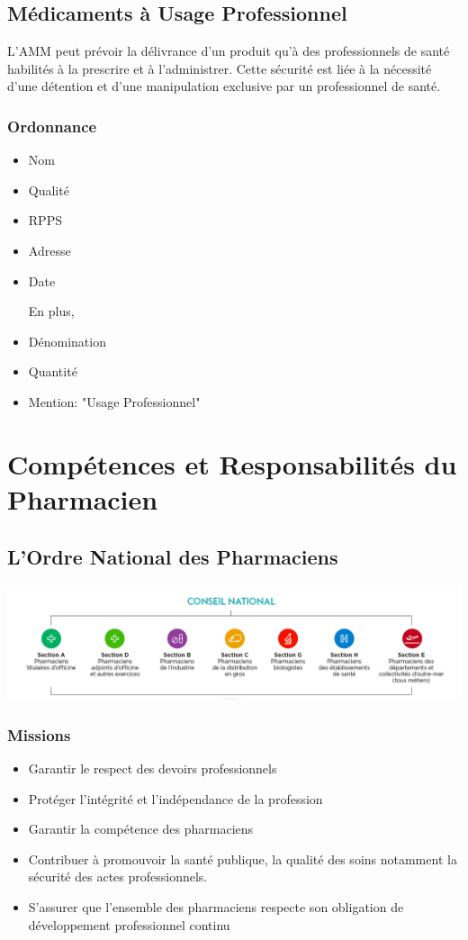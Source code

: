 \documentclass[11pt]{article}
\begin{document}
\subsection{Médicaments à Usage Professionnel}
\label{sec:org60f8e13}
L'AMM peut prévoir la délivrance d'un produit qu'à des professionnels de santé habilités à la prescrire et à l'administrer. Cette sécurité est liée à la nécessité d'une détention et d'une manipulation exclusive par un professionnel de santé.

\subsubsection{Ordonnance}
\label{sec:orgba079a4}
\begin{itemize}
\item Nom
\item Qualité
\item RPPS
\item Adresse
\item Date

En plus,
\item Dénomination
\item Quantité
\item Mention: "Usage Professionnel"
\end{itemize}
\section{Compétences et Responsabilités du Pharmacien}
\label{sec:orgb8c9648}
\setlength{\parindent}{0pt}
\subsection{L'Ordre National des Pharmaciens}
\label{sec:org79f30af}

\begin{center}
\includegraphics[width=.9\linewidth]{./ordre.png}
\end{center}
\subsubsection{Missions}
\label{sec:org5577469}
\begin{itemize}
\item Garantir le respect des devoirs professionnels
\item Protéger l'intégrité et l'indépendance de la profession
\item Garantir la compétence des pharmaciens
\item Contribuer à promouvoir la santé publique, la qualité des soins notamment la sécurité des actes professionnels.
\item S'assurer que l'ensemble des pharmaciens respecte son obligation de développement professionnel continu
\end{itemize}
\end{document}
